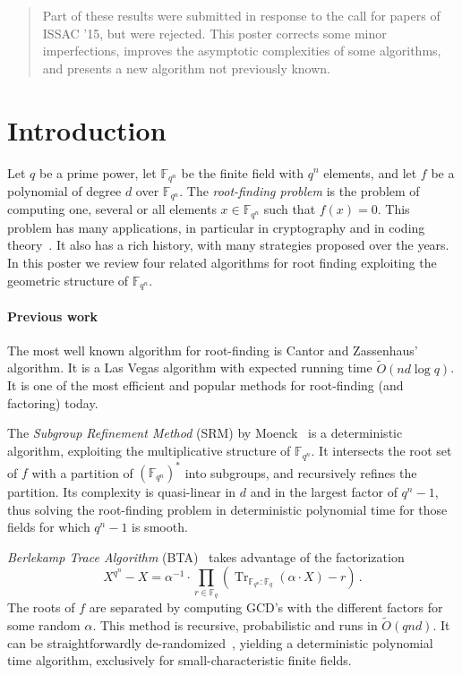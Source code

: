 \documentclass[11pt]{article}
\newcommand{\ff}[1]{\mathbb{F}_{#1}}
\newcommand{\dd}{d}
\newcommand{\qq}{q}
\newcommand{\nn}{n}
\newcommand{\qn}{{\qq^\nn}}
\newcommand{\basef}{\ff{\qq}}
\newcommand{\extf}{\ff{\qn}}
\DeclareMathOperator{\Tr}{Tr}
\newcommand{\tr}[2]{\Tr_{\ff{#1}:\ff{#2}}}
\newcommand{\bigOt}{\tilde{O}}
\newcounter{algo}
\begin{document}
\begin{abstract}
  Part of these results were submitted in response to the call for
  papers of ISSAC '15, but were rejected. This poster corrects some
  minor imperfections, improves the asymptotic complexities of some
  algorithms, and presents a new algorithm not previously known.
\end{abstract}


\section{Introduction}

Let $q$ be a prime power, let $\mathbb{F}_{\qq^\nn}$ be the finite
field with $\qq^\nn$ elements, and let $f$ be a polynomial of degree
$\dd$ over $\mathbb{F}_{\qq^\nn}$.
%
The \emph{root-finding problem} is the problem of computing one,
several or all elements $x\in\mathbb{F}_{\qq^\nn}$ such that $f(x)=0$.
%
This problem has many applications, in particular in cryptography and
in coding theory~\cite{McEliece78}. It also has a rich history, with
many strategies proposed over the years. In this poster we review four
related algorithms for root finding exploiting the geometric structure
of $\extf$.

 
\paragraph{Previous work} The most well known algorithm for
root-finding is Cantor and Zassenhaus'~\cite{cantor1981} algorithm. It
is a Las Vegas algorithm with expected running time $\bigOt(nd\log
q)$. It is one of the most efficient and popular methods for
root-finding (and factoring) today.

The \emph{Subgroup Refinement Method} (SRM) by Moenck~\cite{Moenck77}
is a deterministic algorithm, exploiting the multiplicative structure
of $\extf$. It intersects the root set of $f$ with a partition of
$(\extf)^\ast$ into subgroups, and recursively refines the
partition. Its complexity is quasi-linear in $d$ and in the largest
factor of $q^n-1$, thus solving the root-finding problem in
deterministic polynomial time for those fields for which $q^n-1$ is
smooth.

\emph{Berlekamp Trace Algorithm} (BTA)~\cite{berl70} takes advantage
of the factorization
$$X^{\qq^n}-X=\alpha^{-1} \cdot \prod_{r \in \basef}(\tr{\qq^n}{\qq}(\alpha \cdot X)-r)\,.$$
The roots of $f$ are separated by computing GCD's with the different
factors for some random $\alpha$. This method is recursive,
probabilistic and runs in $\bigOt(qnd)$. It can be straightforwardly
de-randomized~\cite{berl70,Shoup91b}, yielding a deterministic
polynomial time algorithm, exclusively for small-characteristic finite
fields.
\end{document}
